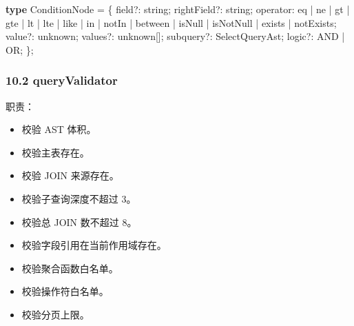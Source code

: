 \documentclass[
  a4paper,
  UTF8]{ctexart}
\newenvironment{Shaded}{}{}
\newcommand{\DataTypeTok}[1]{\textcolor[rgb]{0.56,0.13,0.00}{#1}}
\newcommand{\KeywordTok}[1]{\textcolor[rgb]{0.00,0.44,0.13}{\textbf{#1}}}
\newcommand{\NormalTok}[1]{#1}
\newcommand{\OperatorTok}[1]{\textcolor[rgb]{0.40,0.40,0.40}{#1}}
\newcommand{\StringTok}[1]{\textcolor[rgb]{0.25,0.44,0.63}{#1}}
\providecommand{\tightlist}{%
  \setlength{\itemsep}{0pt}\setlength{\parskip}{0pt}}
\begin{document}
\begin{Shaded}
\begin{Highlighting}[]
\KeywordTok{type}\NormalTok{ ConditionNode }\OperatorTok{=}\NormalTok{ \{}
\NormalTok{  field}\OperatorTok{?:} \DataTypeTok{string}\OperatorTok{;}
\NormalTok{  rightField}\OperatorTok{?:} \DataTypeTok{string}\OperatorTok{;}
\NormalTok{  operator}\OperatorTok{:} \StringTok{\textquotesingle{}eq\textquotesingle{}} \OperatorTok{|} \StringTok{\textquotesingle{}ne\textquotesingle{}} \OperatorTok{|} \StringTok{\textquotesingle{}gt\textquotesingle{}} \OperatorTok{|} \StringTok{\textquotesingle{}gte\textquotesingle{}} \OperatorTok{|} \StringTok{\textquotesingle{}lt\textquotesingle{}} \OperatorTok{|} \StringTok{\textquotesingle{}lte\textquotesingle{}} \OperatorTok{|}
    \StringTok{\textquotesingle{}like\textquotesingle{}} \OperatorTok{|} \StringTok{\textquotesingle{}in\textquotesingle{}} \OperatorTok{|} \StringTok{\textquotesingle{}notIn\textquotesingle{}} \OperatorTok{|} \StringTok{\textquotesingle{}between\textquotesingle{}} \OperatorTok{|}
    \StringTok{\textquotesingle{}isNull\textquotesingle{}} \OperatorTok{|} \StringTok{\textquotesingle{}isNotNull\textquotesingle{}} \OperatorTok{|} \StringTok{\textquotesingle{}exists\textquotesingle{}} \OperatorTok{|} \StringTok{\textquotesingle{}notExists\textquotesingle{}}\OperatorTok{;}
\NormalTok{  value}\OperatorTok{?:} \DataTypeTok{unknown}\OperatorTok{;}
\NormalTok{  values}\OperatorTok{?:} \DataTypeTok{unknown}\NormalTok{[]}\OperatorTok{;}
\NormalTok{  subquery}\OperatorTok{?:}\NormalTok{ SelectQueryAst}\OperatorTok{;}
\NormalTok{  logic}\OperatorTok{?:} \StringTok{\textquotesingle{}AND\textquotesingle{}} \OperatorTok{|} \StringTok{\textquotesingle{}OR\textquotesingle{}}\OperatorTok{;}
\NormalTok{\}}\OperatorTok{;}
\end{Highlighting}
\end{Shaded}

\hypertarget{queryvalidator}{%
\subsubsection{10.2 queryValidator}\label{queryvalidator}}

职责：

\begin{itemize}
\tightlist
\item
  校验 AST 体积。
\item
  校验主表存在。
\item
  校验 JOIN 来源存在。
\item
  校验子查询深度不超过 3。
\item
  校验总 JOIN 数不超过 8。
\item
  校验字段引用在当前作用域存在。
\item
  校验聚合函数白名单。
\item
  校验操作符白名单。
\item
  校验分页上限。
\end{itemize}
\end{document}
